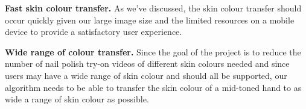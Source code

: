 \textbf{Fast skin colour transfer.} As we've discussed, the skin colour transfer should occur quickly given our large image size and the limited resources on a mobile device to provide a satisfactory user experience.

\textbf{Wide range of colour transfer.} Since the goal of the project is to reduce the number of nail polish try-on videos of different skin colours needed and since users may have a wide range of skin colour and should all be supported, our algorithm needs to be able to transfer the skin colour of a mid-toned hand to as wide a range of skin colour as possible.

